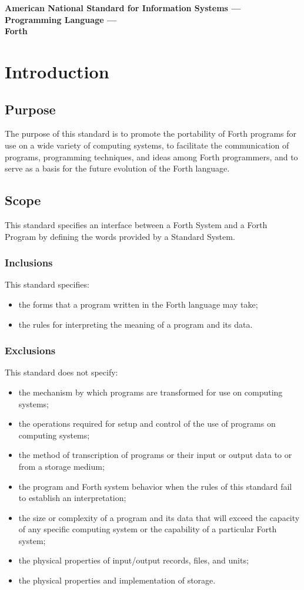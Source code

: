 {\Large\bfseries
American National Standard for Information Systems --- \\[2pt]
Programming Language --- \\[2pt]
Forth
}

\chapter{Introduction}

\section{Purpose}
The purpose of this standard is to promote the portability of Forth
programs for use on a wide variety of computing systems, to facilitate
the communication of programs, programming techniques, and ideas among
Forth programmers, and to serve as a basis for the future evolution of
the Forth language.

\section{Scope}
This standard specifies an interface between a Forth System and a
Forth Program by defining the words provided by a Standard System.

\subsection{Inclusions}
This standard specifies:
\begin{itemize}
\item the forms that a program written in the Forth language may take;
\item the rules for interpreting the meaning of a program and its data.
\end{itemize}

\subsection{Exclusions} %
\label{intro:exclusions}

This standard does not specify:
\begin{itemize}
\item the mechanism by which programs are transformed for use on
	computing systems;
\item the operations required for setup and control of the use of
	programs on computing systems;
\item the method of transcription of programs or their input or
	output data to or from a storage medium;
\item the program and Forth system behavior when the rules of this
	standard fail to establish an interpretation;
\item the size or complexity of a program and its data that will
	exceed the capacity of any specific computing system or the
	capability of a particular Forth system;
\item the physical properties of input/output records, files, and units;
\item the physical properties and implementation of storage.
\end{itemize}

